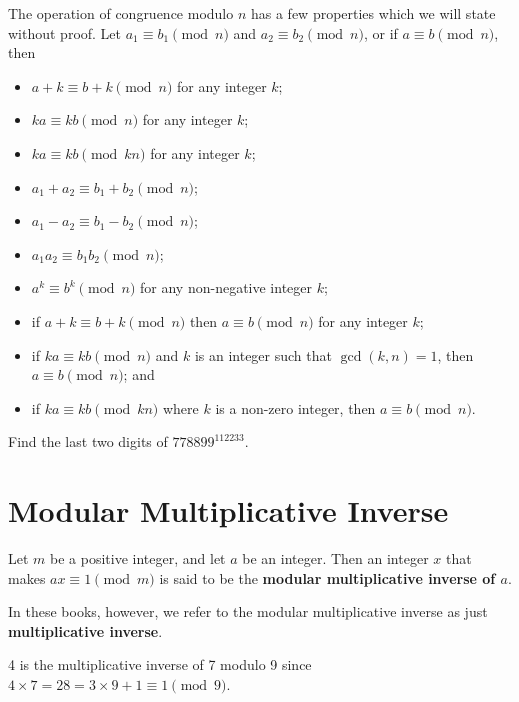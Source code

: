 The operation of congruence modulo $n$ has a few properties which we will state without proof. Let $a_1 \equiv b_1 \pmod n$ and $a_2 \equiv b_2 \pmod n$, or if $a \equiv b \pmod n$, then
\begin{itemize}
    \item $a + k \equiv b + k \pmod n$ for any integer $k$;
    \item $ka \equiv kb \pmod n$ for any integer $k$;
    \item $ka \equiv kb \pmod {kn}$ for any integer $k$;
    \item $a_1 + a_2 \equiv b_1 + b_2 \pmod n$;
    \item $a_1 - a_2 \equiv b_1 - b_2 \pmod n$;
    \item $a_1a_2 \equiv b_1b_2 \pmod n$;
    \item $a^k \equiv b^k \pmod n$ for any non-negative integer $k$;
    \item if $a+k \equiv b+k \pmod n$ then $a \equiv b \pmod n$ for any integer $k$;
    \item if $ka \equiv kb \pmod n$ and $k$ is an integer such that $\gcd(k, n) = 1$, then $a \equiv b \pmod n$; and
    \item if $ka \equiv kb \pmod{kn}$ where $k$ is a non-zero integer, then $a \equiv b \pmod n$.
\end{itemize}

\begin{exercise}
    Find the last two digits of $778899^{112233}$.
\end{exercise}

\section{Modular Multiplicative Inverse}
\begin{definition}
    Let $m$ be a positive integer, and let $a$ be an integer. Then an integer $x$ that makes $ax \equiv 1 \pmod m$ is said to be the \textbf{modular multiplicative inverse of $a$}.
\end{definition}
\begin{remark}
    In these books, however, we refer to the modular multiplicative inverse as just \textbf{multiplicative inverse}.
\end{remark}
\begin{example}
    4 is the multiplicative inverse of 7 modulo 9 since $4 \times 7 = 28 = 3 \times 9 + 1 \equiv 1 \pmod 9$.
\end{example}


